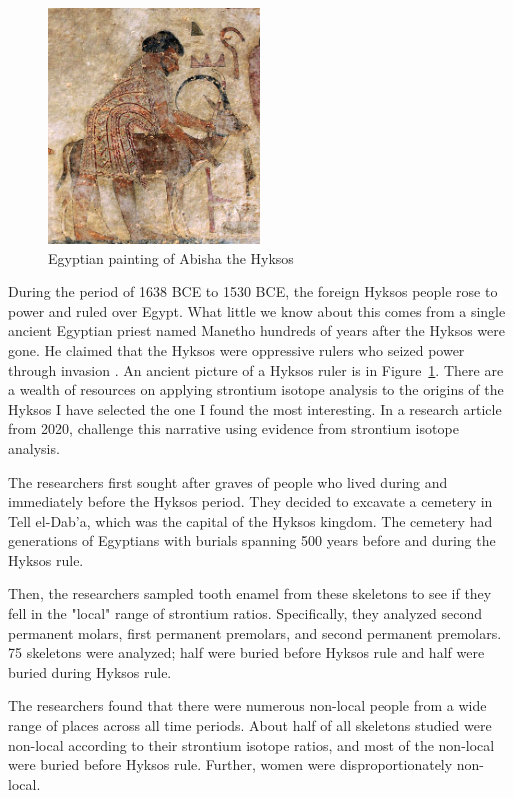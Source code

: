 \documentclass[a4paper, 12pt]{article}
\begin{document}
\begin{figure}[htbp]
    \centering
    \includegraphics[width=0.5\textwidth]{hyksos_painting.jpg}
    \caption{Egyptian painting of Abisha the Hyksos \citep{wikipediaHyksos}}
    \label{fig:hyksos_painting}
\end{figure}
During the period of 1638 BCE to 1530 BCE, the foreign Hyksos people rose to power
and ruled over Egypt. What little we know about this comes
from a single ancient Egyptian priest named Manetho hundreds of years after the Hyksos were gone. He
claimed that the Hyksos were oppressive rulers who seized power through invasion \citep{stantis2020}.
An ancient picture of a Hyksos ruler is in Figure~\ref{fig:hyksos_painting}. There are a wealth
of resources on applying strontium isotope analysis to the origins of the Hyksos \citep*{stantis2020, stantis2021, weinstein2021, maaranen2019}
I have selected the one I found the most interesting. In a research article from 2020, \cite{stantis2020} challenge this narrative
using evidence from strontium isotope analysis.

The researchers first sought after graves of people who lived during and immediately
before the Hyksos period. They decided to excavate a cemetery in Tell el-Dab'a,
which was the capital of the Hyksos kingdom. The cemetery had generations of Egyptians
with burials spanning 500 years before and during the Hyksos rule.

Then, the researchers sampled tooth enamel from these skeletons to see if they fell
in the "local" range of strontium ratios. Specifically, they analyzed second permanent molars,
first permanent premolars, and second permanent premolars. 75 skeletons were analyzed;
half were buried before Hyksos rule and half were buried during Hyksos rule.

The researchers found that there were numerous non-local people from a wide range
of places across all time periods. About half of all skeletons studied were non-local
according to their strontium isotope ratios, and most of the non-local were buried
before Hyksos rule. Further, women were disproportionately non-local.
\end{document}
